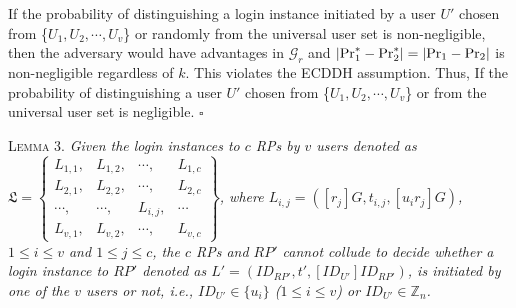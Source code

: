 {If the probability of distinguishing a login instance initiated by a user $U'$ chosen from \{${U_1}, {U_2}, \cdots, {U_v}$\} or randomly from the universal user set is non-negligible,
    then the adversary would have advantages in $\mathcal{G}_r$ and $|{\rm Pr}^*_1-{\rm Pr}^*_2|=|{\rm Pr}_1-{\rm Pr}_2|$ is non-negligible regardless of $k$.
This violates the ECDDH assumption.
Thus, If the probability of distinguishing a user $U'$ chosen from \{${U_1}, {U_2}, \cdots, {U_v}$\} or from the universal user set is negligible.
\hfill $\square$


\oldc
\vspace{1mm}
\noindent\textsc{Lemma 3.} {\em Given
    the login instances to $c$ RPs by $v$ users denoted as
 $\mathfrak{L}=\left \{ \begin{matrix}
L_{1,1},&L_{1,2},&\cdots,&L_{1,c}\\
L_{2,1},& L_{2,2},&\cdots,&L_{2,c}\\
\cdots,&\cdots,&L_{i,j},&\cdots\\
L_{v,1},&L_{v,2},&\cdots,&L_{v,c}
\end{matrix}\right\}$, where
 $L_{i, j}=([r_j]G, t_{i,j}, [u_ir_j]G)$, $1 \le i \le v$ and $1 \le j \le c$,
the $c$ RPs and $RP'$ cannot collude to decide whether a login instance to $RP'$ denoted as $L' = (ID_{RP'}, t', [ID_{U'}]ID_{RP'})$, is initiated by one of the $v$ users or not, i.e., $ID_{U'} \in \{u_i\}$ ($1 \leq i \leq v$) or $ID_{U'} \in \mathbb{Z}_n$.}





}
